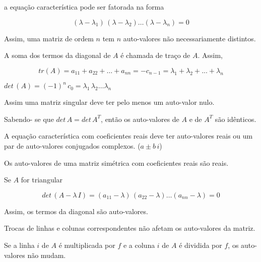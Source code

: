 \begin{enumerar}

\item a equação característica pode ser fatorada na forma

\[
 (\lambda - \lambda_1) \, (\lambda - \lambda_2) \ldots (\lambda - \lambda_n) = 0
\]

Assim, uma matriz de ordem $ n $ tem $ n $ auto-valores não necessariamente distintos.

\item A soma dos termos da diagonal de $ A $ é chamada de traço de $ A $. Assim,

\[
 tr(A) = a_{11} + a_{22} + \ldots + a_{nn} = - c_{n-1} = \lambda_1 + \lambda_2 + ... + \lambda_n
\]

\item $ det \, (A) = (-1)^n \, c_0 = \lambda_1 \, \lambda_2 \ldots \lambda_n $

Assim uma matriz singular deve ter pelo menos um auto-valor nulo.

\item Sabendo- se que $ det \, A = det \, A^T $, então os auto-valores de $ A $ e de $ A^T $ são idênticos.

\item A equação característica com coeficientes reais deve ter auto-valores reais ou um par de auto-valores conjugados complexos. ($ a \pm b \, i $)

\item Os auto-valores de uma matriz simétrica com coeficientes reais são reais.

\item Se $ A $ for triangular

\[
 det \, (A - \lambda \, I) = (a_{11} - \lambda) \, (a_{22} - \lambda) \ldots (a_{nn} - \lambda) = 0
\]

Assim, os termos da diagonal são auto-valores.

\item Trocas de linhas e colunas correspondentes não afetam os auto-valores da matriz.

\item Se a linha $ i $ de $ A $ é multiplicada por $ f $ e a coluna $ i $ de $ A $ é dividida por $ f $, os auto-valores não mudam.

\end{enumerar}

